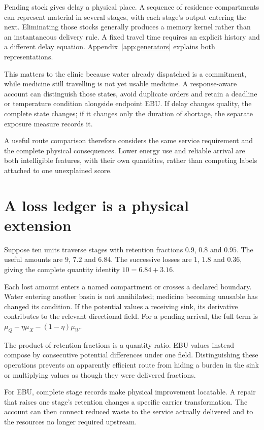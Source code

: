 Pending stock gives delay a physical place. A sequence of residence compartments can represent material in several stages, with each stage's output entering the next. Eliminating those stocks generally produces a memory kernel rather than an instantaneous delivery rule. A fixed travel time requires an explicit history and a different delay equation. Appendix~\ref{app:generators} explains both representations.

This matters to the clinic because water already dispatched is a commitment, while medicine still travelling is not yet usable medicine. A response-aware account can distinguish those states, avoid duplicate orders and retain a deadline or temperature condition alongside endpoint EBU. If delay changes quality, the complete state changes; if it changes only the duration of shortage, the separate exposure measure records it.

A useful route comparison therefore considers the same service requirement and the complete physical consequences. Lower energy use and reliable arrival are both intelligible features, with their own quantities, rather than competing labels attached to one unexplained score.

\section{A loss ledger is a physical extension}
Suppose ten units traverse stages with retention fractions $0.9$, $0.8$ and $0.95$. The useful amounts are $9$, $7.2$ and $6.84$. The successive losses are $1$, $1.8$ and $0.36$, giving the complete quantity identity $10=6.84+3.16$.

Each lost amount enters a named compartment or crosses a declared boundary. Water entering another basin is not annihilated; medicine becoming unusable has changed its condition. If the potential values a receiving sink, its derivative contributes to the relevant directional field. For a pending arrival, the full term is $\mu_Q-\eta\mu_X-(1-\eta)\mu_W$.

The product of retention fractions is a quantity ratio. EBU values instead compose by consecutive potential differences under one field. Distinguishing these operations prevents an apparently efficient route from hiding a burden in the sink or multiplying values as though they were delivered fractions.

For EBU, complete stage records make physical improvement locatable. A repair that raises one stage's retention changes a specific carrier transformation. The account can then connect reduced waste to the service actually delivered and to the resources no longer required upstream.

